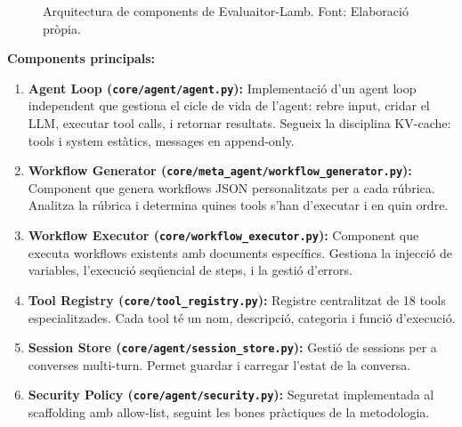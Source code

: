 \documentclass[12pt,a4paper,twoside]{report}
\begin{document}
\begin{figure}[H]
\begin{tikzpicture}
\end{tikzpicture}
\caption{Arquitectura de components de Evaluaitor-Lamb. Font: Elaboraci\'o pr\`opia.}
\label{fig:arquitectura}
\end{figure}

\textbf{Components principals:}

\begin{enumerate}
    \item \textbf{Agent Loop (\texttt{core/agent/agent.py}):} Implementaci\'o d'un agent loop independent que gestiona el cicle de vida de l'agent: rebre input, cridar el LLM, executar tool calls, i retornar resultats. Segueix la disciplina KV-cache: tools i system est\`atics, messages en append-only.
    \item \textbf{Workflow Generator (\texttt{core/meta\_agent/workflow\_generator.py}):} Component que genera workflows JSON personalitzats per a cada r\'ubrica. Analitza la r\'ubrica i determina quines tools s'han d'executar i en quin ordre.
    \item \textbf{Workflow Executor (\texttt{core/workflow\_executor.py}):} Component que executa workflows existents amb documents espec\'ifics. Gestiona la injecci\'o de variables, l'execuci\'o seq\"uencial de steps, i la gesti\'o d'errors.
    \item \textbf{Tool Registry (\texttt{core/tool\_registry.py}):} Registre centralitzat de 18 tools especialitzades. Cada tool t\'e un nom, descripci\'o, categoria i funci\'o d'execuci\'o.
    \item \textbf{Session Store (\texttt{core/agent/session\_store.py}):} Gesti\'o de sessions per a converses multi-turn. Permet guardar i carregar l'estat de la conversa.
    \item \textbf{Security Policy (\texttt{core/agent/security.py}):} Seguretat implementada al scaffolding amb allow-list, seguint les bones pr\`actiques de la metodologia.
\end{enumerate}
\end{document}
